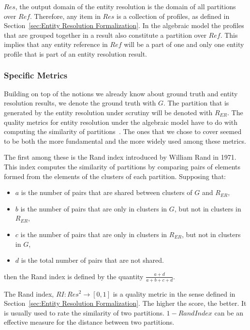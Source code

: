 $Res$, the output domain of the entity resolution is the domain of all
partitions over $Ref$.
Therefore, any item in $Res$ is a collection of profiles, as defined in
Section~\ref{sec:Entity Resolution Formalization}.
In the algebraic model the profiles that are grouped together in a result also
constitute a partition over $Ref$.
This implies that any entity reference in $Ref$ will be a part of one and only
one entity profile that is part of an entity resolution result.

\subsubsection{Specific Metrics}\label{subsubsec:Algebraic Quality Metrics}

Building on top of the notions we already know about ground truth and entity
resolution results, we denote the ground truth with $G$.
The partition that is generated by the entity resolution under scrutiny will be
denoted with $R_{ER}$. 
The quality metrics for entity resolution under the algebraic model have to
do with computing the similarity of partitions~\cite{hitesh2012}.
The ones that we chose to cover seemed to be both the more fundamental and the
more widely used among these metrics.

The first among these is the Rand index introduced by William Rand in
1971\cite{rand1971}.
This index computes the similarity of partitions by comparing pairs of
elements formed from the elements of the clusters of each partition.
Supposing that:
\begin{itemize}
    \item $a$ is the number of pairs that are shared between clusters of $G$
    and $R_{ER}$,
    \item $b$ is the number of pairs that are only in clusters in $G$, but
    not in clusters in $R_{ER}$,
    \item $c$ is the number of pairs that are only in clusters in $R_{ER}$, but
    not in clusters in $G$,
    \item $d$ is the total number of pairs that are not shared.
\end{itemize}
then the Rand index is defined by the quantity
$\frac{a+d}{a+b+c+d}$\cite{adjrand2001}.

The Rand index, $RI : Res^2 \rightarrow \left[0, 1\right]$ is a quality metric
in the sense defined in Section~\ref{sec:Entity Resolution Formalization}.
The higher the score, the better.
It is usually used to rate the similarity of two partitions.
$1 - Rand Index$ can be an effective measure for the distance between two
partitions.

